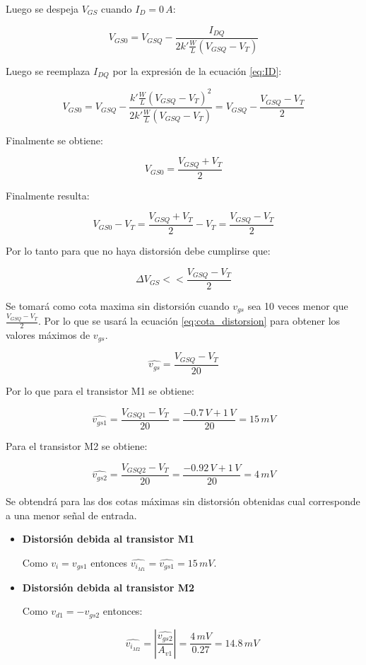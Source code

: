 \documentclass[10pt,spanish,a4paper,notitlepage]{article}
\begin{document}
Luego se despeja $V_{GS}$ cuando $I_D = 0\,\unit{A}$:

\[ \displaystyle V_{GS0} = V_{GSQ} - \frac{I_{DQ}}{2k'\frac{W}{L} (V_{GSQ} - V_T)} \]

Luego se reemplaza $I_{DQ}$ por la expresión de la ecuación \ref{eq:ID}:

\[ \displaystyle V_{GS0} = V_{GSQ} - \frac{k'\frac{W}{L}(V_{GSQ} - V_T)^2}{2k'\frac{W}{L} (V_{GSQ} - V_T)} 
= V_{GSQ} - \frac{V_{GSQ} - V_T}{2} \]

Finalmente se obtiene:

\begin{equation}
V_{GS0} = \frac{V_{GSQ} + V_T}{2}
\label{eq:V_GS0}
\end{equation}

Finalmente resulta:

\[ \displaystyle V_{GS0} - V_T = \frac{V_{GSQ} + V_T}{2} - V_T = \frac{V_{GSQ} - V_T}{2} \]

Por lo tanto para que no haya distorsión debe cumplirse que:

\begin{equation}
 \Delta V_{GS} << \frac{V_{GSQ} - V_T}{2}
\label{eq:distorsion}
\end{equation}

Se tomará como cota maxima sin distorsión cuando $v_{gs}$ sea 10
veces menor que $\frac{V_{GSQ} - V_T}{2}$. Por lo que se usará
la ecuación \ref{eq:cota_distorsion} para obtener los valores
máximos de $v_{gs}$.

\begin{equation}
   \widehat{v_{gs}} = \frac{V_{GSQ} - V_T}{20}
\label{eq:cota_distorsion}
\end{equation}

Por lo que para el transistor M1 se obtiene:

\[ \displaystyle \widehat{v_{gs1}} = \frac{V_{GSQ1} - V_T}{20} =
\frac{-0.7\,\unit{V} + 1\,\unit{V}}{20} = 15\,\unit{mV}\]

Para el transistor M2 se obtiene:

\[ \displaystyle \widehat{v_{gs2}} = \frac{V_{GSQ2} - V_T}{20} =
\frac{-0.92\,\unit{V} + 1\,\unit{V}}{20} = 4\,\unit{mV}\]

Se obtendrá para las dos cotas máximas sin distorsión obtenidas cual
corresponde a una menor señal de entrada.

\begin{itemize}
\item \textbf{Distorsión debida al transistor M1}

Como $v_i = v_{gs1}$ entonces $\widehat{v_{i_{M1}}} = \widehat{v_{gs1}} = 15\,\unit{mV}$.

\item \textbf{Distorsión debida al transistor M2}

Como $v_{d1} = -v_{gs2}$ entonces:

\[ \displaystyle \widehat{v_{i_{M2}}} = \left| \frac{\widehat{v_{gs2}}}{A_{v1}} \right| = \frac{4\,\unit{mV}}{0.27} = 14.8\,\unit{mV} \]

\end{itemize}
\end{document}
